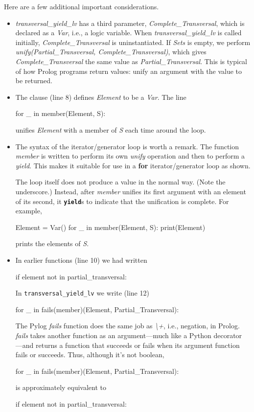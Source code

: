 \begin{sloppypar}
\begin{itemize}[label=$\bullet$]
Here are a few additional important considerations.
\begin{itemize}[label=$\circ$]
\item  \textit{transversal\_yield\_lv} has a third parameter, \textit{Complete\_Transversal}, which is declared as a \textit{Var}, i.e., a logic variable. When \textit{transversal\_yield\_lv} is called initially, \textit{Complete\_Transversal} is uninstantiated. If \textit{Sets} is empty, we perform \textit{unify(Partial\_Transversal, Complete\_Transversal)}, which gives \textit{Complete\_Transversal} the same value as \textit{Partial\_Transversal}. This is typical of how Prolog programs return values: unify an argument with the value to be returned.
\item The  clause (line 8) defines \textit{Element} to be a \textit{Var}. The line 
\begin{python}
    for _ in member(Element, S):
\end{python}
unifies \textit{Element} with a member of \textit{S} each time around the loop. 
\smallv

\item The syntax of the  iterator/generator loop is worth a remark. The function \textit{member} is written to perform its own \textit{unify} operation and then to perform a \textit{yield}. This makes it suitable for use in a \textbf{for} iterator/generator loop as shown. 
\smallv

The  loop itself does not produce a value in the normal way. (Note the underscore.) Instead, after \textit{member} unifies its first argument with an element of its second, it \texttt{\textbf{yield}}s to indicate that the unification is complete. For example, 
\begin{python}
Element = Var()
for _ in member(Element, S):
  print(Element)
\end{python}
prints the elements of \textit{S}.
\smallv

\item In earlier functions (line 10) we had written 
\begin{python}
if element not in partial_transversal:
\end{python}
In \texttt{transversal\_yield\_lv} we write (line 12)
\begin{python}
for _ in fails(member)(Element, Partial_Transversal):
\end{python}
The Pylog \textit{fails} function does the same job as \textit{\textbackslash+}, i.e., negation, in Prolog. \textit{fails} takes another function as an argument---much like a Python decorator ---and returns a function that succeeds or fails when its argument function fails or succeeds. Thus, although it's not boolean,
\begin{python}
for _ in fails(member)(Element, Partial_Transversal):
\end{python} 
is approximately equivalent to
\begin{python}
if element not in partial_transversal:
\end{python}
\smallv


\end{itemize}
\end{itemize}
\end{sloppypar}
